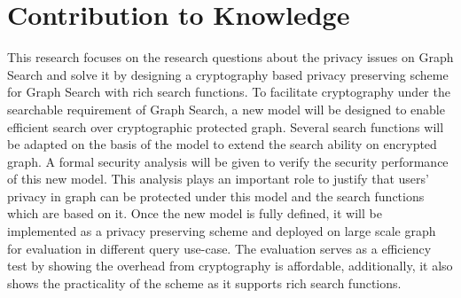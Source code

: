 \chapter{Contribution to Knowledge}
This research focuses on the research questions about the privacy issues on Graph Search and solve it by designing a cryptography based privacy preserving scheme for Graph Search with rich search functions. To facilitate cryptography under the searchable requirement of Graph Search, a new model will be designed to enable efficient search over cryptographic protected graph. Several search functions will be adapted on the basis of the model to extend the search ability on encrypted graph. A formal security analysis will be given to verify the security performance of this new model. This analysis plays an important role to justify that users' privacy in graph can be protected under this model and the search functions which are based on it. Once the new model is fully defined, it will be implemented as a privacy preserving scheme and deployed on large scale graph for evaluation in different query use-case. The evaluation serves as a efficiency test by showing the overhead from cryptography is affordable, additionally, it also shows the practicality of the scheme as it supports rich search functions.
